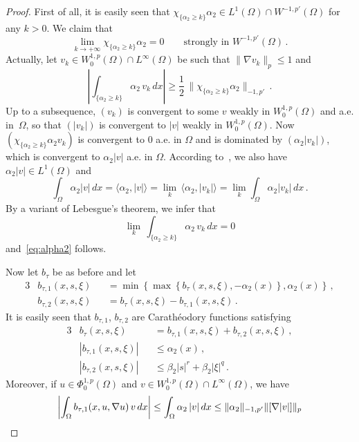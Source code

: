 \documentclass[twoside,reqno]{amsart}
\numberwithin{equation}{section}
\theoremstyle{definition}
\begin{document}
%
\begin{proof}
First of all, it is easily seen that
$\chi_{\{\alpha_2\geq k\}}\alpha_2
\in L^1(\Omega)\cap W^{-1,p'}(\Omega)$ for any $k>0$.
We claim that
\begin{equation}
\label{eq:alpha2}
\lim_{k\to+\infty} \chi_{\{\alpha_2\geq k\}}\alpha_2 = 0
\qquad\text{strongly in $W^{-1,p'}(\Omega)$}\,.
\end{equation}
Actually, let
$v_k\in W^{1,p}_0(\Omega)\cap L^\infty(\Omega)$ be such that
$\|\nabla v_k\|_p\leq 1$ and
\[
\left|\int_{\{\alpha_2\geq k\}} \alpha_2\,v_k\,dx\right| \geq
\frac{1}{2}\,\|\chi_{\{\alpha_2\geq k\}}\alpha_2\|_{-1,p'}  \,.
\]
Up to a subsequence, $(v_k)$ is convergent to some 
$v$ weakly in $W^{1,p}_0(\Omega)$ and a.e. in~$\Omega$,
so that $(|v_k|)$ is convergent to  
$|v|$ weakly in $W^{1,p}_0(\Omega)$.
Now $(\chi_{\{\alpha_2\geq k\}}\alpha_2 v_k)$
is convergent to $0$ a.e. in $\Omega$ and is dominated by
$(\alpha_2 |v_k|)$, which is convergent to
$\alpha_2 |v|$ a.e. in $\Omega$.
According to~\cite{brezis_browder1978}, we also have
$\alpha_2 |v|\in L^1(\Omega)$ and
\[
\int_{\Omega} \alpha_2|v|\,dx
= \langle\alpha_2,|v|\rangle
= \lim_k \,\langle\alpha_2,|v_k|\rangle 
= \lim_k \int_{\Omega} \alpha_2|v_k|\,dx \,.
\]
By a variant of Lebesgue's theorem, we infer that
\[
\lim_k \,\int_{\{\alpha_2\geq k\}} \alpha_2\,v_k\,dx = 0
\]
and~\eqref{eq:alpha2} follows.
\par
Now let $b_\tau$ be as before and let
\begin{alignat*}{3}
&b_{\tau,1}(x,s,\xi) &&=
\min\left\{\max\left\{b_\tau(x,s,\xi),-\alpha_2(x)\right\},
\alpha_2(x)\right\}\,,\\
&b_{\tau,2}(x,s,\xi) &&=
b_\tau(x,s,\xi) - b_{\tau,1}(x,s,\xi)\,.
\end{alignat*}
It is easily seen that $b_{\tau,1}$, $b_{\tau,2}$ are Carath\'eodory
functions satisfying
\begin{alignat*}{3}
&b_\tau(x,s,\xi) &&= b_{\tau,1}(x,s,\xi) + b_{\tau,2}(x,s,\xi)\,,\\
&|b_{\tau,1}(x,s,\xi)| &&\leq \alpha_2(x)\,,\\
&|b_{\tau,2}(x,s,\xi)| &&\leq \beta_2|s|^r +\beta_2|\xi|^q\,.
\end{alignat*}
Moreover, if $u\in \Phi^{1,p}_0(\Omega)$ and 
$v\in W^{1,p}_0(\Omega)\cap L^\infty(\Omega)$, we have
\[
\left|\int_\Omega b_{\tau,1}(x,u,\nabla u)\,v\,dx\right| \leq
\int_\Omega \alpha_2\,|v|\,dx \\
\leq
\|\alpha_2\|_{-1,p'} \|[\nabla|v|]\|_p \\
\]
\end{proof}
\end{document}
